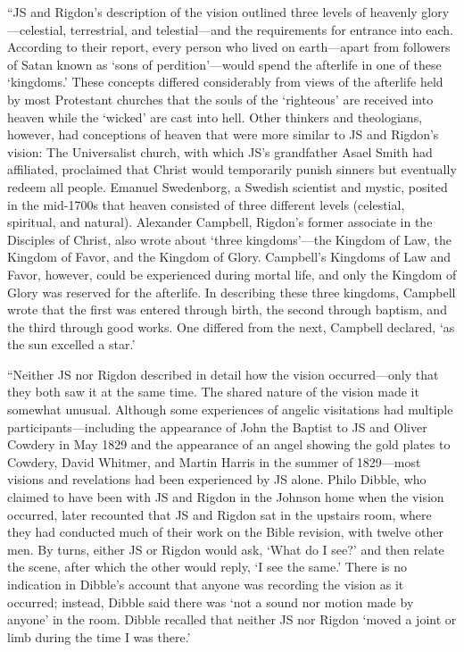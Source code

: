 			``JS and Rigdon's description of the vision outlined three levels of heavenly glory---celestial, terrestrial, and telestial---and the requirements for entrance into each. According to their report, every person who lived on earth---apart from followers of Satan known as `sons of perdition'---would spend the afterlife in one of these `kingdoms.' These concepts differed considerably from views of the afterlife held by most Protestant churches that the souls of the `righteous' are received into heaven while the `wicked' are cast into hell. Other thinkers and theologians, however, had conceptions of heaven that were more similar to JS and Rigdon's vision: The Universalist church, with which JS's grandfather Asael Smith had affiliated, proclaimed that Christ would temporarily punish sinners but eventually redeem all people. Emanuel Swedenborg, a Swedish scientist and mystic, posited in the mid-1700s that heaven consisted of three different levels (celestial, spiritual, and natural). Alexander Campbell, Rigdon's former associate in the Disciples of Christ, also wrote about `three kingdoms'---the Kingdom of Law, the Kingdom of Favor, and the Kingdom of Glory. Campbell's Kingdoms of Law and Favor, however, could be experienced during mortal life, and only the Kingdom of Glory was reserved for the afterlife. In describing these three kingdoms, Campbell wrote that the first was entered through birth, the second through baptism, and the third through good works. One differed from the next, Campbell declared, `as the sun excelled a star.'
			
			``Neither JS nor Rigdon described in detail how the vision occurred---only that they both saw it at the same time. The shared nature of the vision made it somewhat unusual. Although some experiences of angelic visitations had multiple participants---including the appearance of John the Baptist to JS and Oliver Cowdery in May 1829 and the appearance of an angel showing the gold plates to Cowdery, David Whitmer, and Martin Harris in the summer of 1829---most visions and revelations had been experienced by JS alone. Philo Dibble, who claimed to have been with JS and Rigdon in the Johnson home when the vision occurred, later recounted that JS and Rigdon sat in the upstairs room, where they had conducted much of their work on the Bible revision, with twelve other men. By turns, either JS or Rigdon would ask, `What do I see?' and then relate the scene, after which the other would reply, `I see the same.' There is no indication in Dibble's account that anyone was recording the vision as it occurred; instead, Dibble said there was `not a sound nor motion made by anyone' in the room. Dibble recalled that neither JS nor Rigdon `moved a joint or limb during the time I was there.'
			
